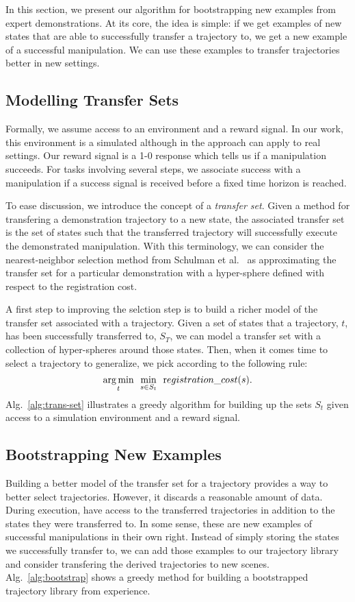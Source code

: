 In this section, we present our algorithm for bootstrapping new examples 
from expert demonstrations. At its core, the idea is simple: if we get
examples of new states that are able to successfully transfer a trajectory to,
we get a new example of a successful manipulation. We can use these examples
to transfer trajectories better in new settings.

\subsection{Modelling Transfer Sets}
Formally, we assume access to an environment and a reward signal. In our work, this
environment is a simulated although in the approach can apply to real settings. 
Our reward signal is a 1-0 response which tells us if a manipulation succeeds. For 
tasks involving several steps, we associate success with a manipulation if a success
signal is received before a fixed time horizon is reached.

To ease discussion, we introduce the concept of a \emph{transfer set}. Given a method for
transfering a demonstration trajectory to a new state, the associated transfer set is
the set of states such that the transferred trajectory will successfully execute the
demonstrated manipulation. With this terminology, we can consider the nearest-neighbor
selection method from Schulman et al.~\cite{Schulmanetal_ISRR2013} as approximating the
transfer set for a particular demonstration with a hyper-sphere defined with respect
to the registration cost.

A first step to improving the selction step is to build a richer
model of the transfer set associated with a trajectory. Given a set of
states that a trajectory, $t$,  has been successfully transferred to, $S_T$, we can
model a transfer set with a collection of hyper-spheres around those states.
Then, when it comes time to select a trajectory to generalize, we pick according to
the following rule:
\begin{equation}
\underset{t}{\operatorname*{arg\,min}} \ \ \underset{s\in S_t}{\min} \ \ {\text registration\_cost}(s).
\end{equation}
Alg.~\ref{alg:trans-set} illustrates a greedy algorithm for building up the sets $S_t$ given
access to a simulation environment and a reward signal. 

\subsection{Bootstrapping New Examples}
Building a better model of the transfer set for a trajectory provides a way
to better select trajectories. However, it discards a reasonable amount of
data. During execution, have access to the transferred trajectories in addition
to the states they were transferred to. In some sense, these are new examples of 
successful manipulations in their own right. Instead of simply storing
the states we successfully transfer to, we can add those examples to our trajectory 
library and consider transfering the derived trajectories to new scenes. 
Alg.~\ref{alg:bootstrap} shows a greedy method for building a bootstrapped trajectory
library from experience.

